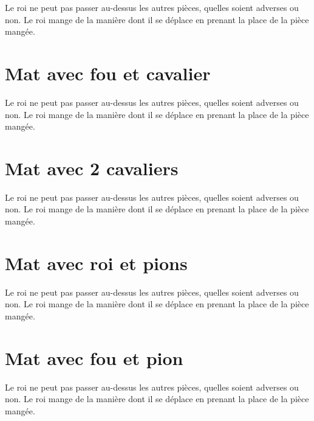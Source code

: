 \documentclass[a5paper,openany,twocolumn]{book}
\begin{document}
{Le roi ne peut pas passer au-dessus les autres pièces, quelles soient adverses ou non. Le roi mange de la manière dont il se déplace en prenant la place de la pièce mangée. 


\chapter{Mat avec fou et cavalier}

Le roi ne peut pas passer au-dessus les autres pièces, quelles soient adverses ou non. Le roi mange de la manière dont il se déplace en prenant la place de la pièce mangée. 


\chapter{Mat avec 2 cavaliers}

Le roi ne peut pas passer au-dessus les autres pièces, quelles soient adverses ou non. Le roi mange de la manière dont il se déplace en prenant la place de la pièce mangée. 


\chapter{Mat avec roi et pions}
 
Le roi ne peut pas passer au-dessus les autres pièces, quelles soient adverses ou non. Le roi mange de la manière dont il se déplace en prenant la place de la pièce mangée. 


\chapter{Mat avec fou et pion}

Le roi ne peut pas passer au-dessus les autres pièces, quelles soient adverses ou non. Le roi mange de la manière dont il se déplace en prenant la place de la pièce mangée. 

}
\end{document}
